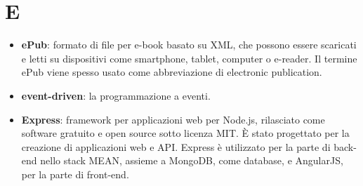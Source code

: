 \section{E}
\begin{itemize} 
	\item \textbf{ePub}: formato di file per e-book basato su XML, che possono essere scaricati e letti su dispositivi come smartphone, tablet, computer o e-reader. Il termine ePub viene spesso usato come abbreviazione di electronic publication.
	\item \textbf{event-driven}: la programmazione a eventi.
	\item \textbf{Express}: framework per applicazioni web per Node.js, rilasciato come software gratuito e open source sotto licenza MIT. È stato progettato per la creazione di applicazioni web e API. Express è utilizzato per la parte di back-end nello stack MEAN, assieme a MongoDB, come database, e AngularJS, per la parte di front-end.
\end{itemize}